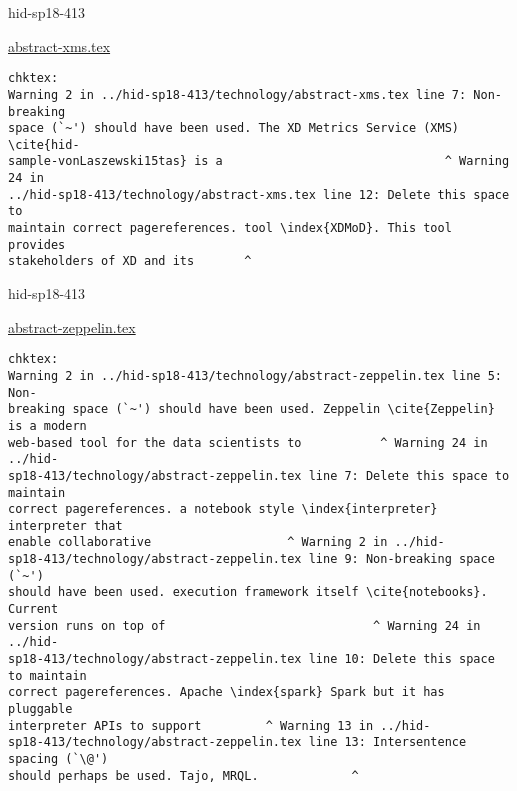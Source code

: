 

\begin{IU}

hid-sp18-413

\href{https://github.com/cloudmesh-community/hid-sp18-413/blob/master//technology/abstract-xms.tex}{abstract-xms.tex}

\begin{tiny}
\begin{verbatim}
chktex:
Warning 2 in ../hid-sp18-413/technology/abstract-xms.tex line 7: Non-breaking
space (`~') should have been used. The XD Metrics Service (XMS) \cite{hid-
sample-vonLaszewski15tas} is a                               ^ Warning 24 in
../hid-sp18-413/technology/abstract-xms.tex line 12: Delete this space to
maintain correct pagereferences. tool \index{XDMoD}. This tool provides
stakeholders of XD and its       ^
\end{verbatim}
\end{tiny}
\end{IU}



\begin{IU}

hid-sp18-413

\href{https://github.com/cloudmesh-community/hid-sp18-413/blob/master//technology/abstract-zeppelin.tex}{abstract-zeppelin.tex}

\begin{tiny}
\begin{verbatim}
chktex:
Warning 2 in ../hid-sp18-413/technology/abstract-zeppelin.tex line 5: Non-
breaking space (`~') should have been used. Zeppelin \cite{Zeppelin} is a modern
web-based tool for the data scientists to           ^ Warning 24 in ../hid-
sp18-413/technology/abstract-zeppelin.tex line 7: Delete this space to maintain
correct pagereferences. a notebook style \index{interpreter} interpreter that
enable collaborative                   ^ Warning 2 in ../hid-
sp18-413/technology/abstract-zeppelin.tex line 9: Non-breaking space (`~')
should have been used. execution framework itself \cite{notebooks}. Current
version runs on top of                             ^ Warning 24 in ../hid-
sp18-413/technology/abstract-zeppelin.tex line 10: Delete this space to maintain
correct pagereferences. Apache \index{spark} Spark but it has pluggable
interpreter APIs to support         ^ Warning 13 in ../hid-
sp18-413/technology/abstract-zeppelin.tex line 13: Intersentence spacing (`\@')
should perhaps be used. Tajo, MRQL.             ^
\end{verbatim}
\end{tiny}
\end{IU}

